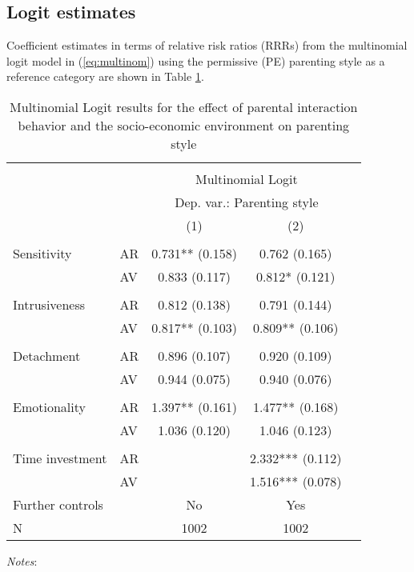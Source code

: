 \subsection{Logit estimates}
Coefficient estimates in terms of relative risk ratios (RRRs) from the multinomial logit model in (\ref{eq:multinom}) using the permissive (PE) parenting style as a reference category are shown in Table \ref{tab:res}.  
%
\begin{table}[!htbp]
	\centering
	\begin{threeparttable}
		\caption{Multinomial Logit results for the effect of parental interaction behavior and the socio-economic environment on parenting style}
		\label{tab:res}
		\begin{tabular}[t]{llccc}
			\hline \hline \\[-1.8ex]
			&    &  \multicolumn{2}{c}{Multinomial Logit}\\
			&    &  \multicolumn{2}{c}{Dep. var.: Parenting style}\\
			&    & (1) & (2) \\
			\cline{3-4} \\[-1.8ex]
			Sensitivity & AR & 0.731** (0.158) & 0.762 (0.165)\\
			& AV & 0.833 (0.117) & 0.812* (0.121)\\
			&  &  \vphantom{4} & \\
			Intrusiveness & AR & 0.812 (0.138) & 0.791 (0.144)\\
			& AV & 0.817** (0.103) & 0.809** (0.106)\\
			&  &  \vphantom{3} & \\
			Detachment & AR & 0.896 (0.107) & 0.920 (0.109)\\
			& AV & 0.944 (0.075) & 0.940 (0.076)\\
			&  &  \vphantom{2} & \\
			Emotionality & AR & 1.397** (0.161) & 1.477** (0.168)\\
			& AV & 1.036 (0.120) & 1.046 (0.123)\\
			&  &  \vphantom{1} & \\
			Time investment & AR &  & 2.332*** (0.112)\\
			& AV &  & 1.516*** (0.078)\\
			\midrule
			Further controls &  & No & Yes\\
			N &  & 1002 & 1002\\
			\bottomrule
		\end{tabular}
		\begin{tablenotes}
			\small
			\item \textit{Notes}: 
		\end{tablenotes}
	\end{threeparttable}
\end{table}
